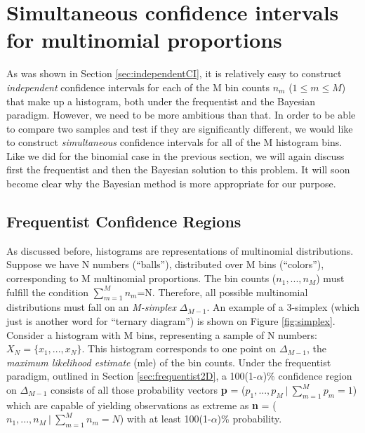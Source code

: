 \documentclass{article}
\begin{document}
\section{Simultaneous confidence intervals for multinomial proportions}
\label{sec:simultaneousCI}

As was shown in Section \ref{sec:independentCI}, it is relatively easy
to construct {\it independent} confidence  intervals for each of the M
bin counts  $n_m$ ($1 \leq m \leq M$) that make up  a histogram, both
under the frequentist  and the Bayesian paradigm. However,  we need to
be  more ambitious  than that.   In order  to be  able to  compare two
samples and test if they are significantly different, we would like to
construct  {\it simultaneous} confidence  intervals for  all of  the M
histogram  bins. Like we  did for  the binomial  case in  the previous
section,  we will  again discuss  first the  frequentist and  then the
Bayesian solution to  this problem. It will soon  become clear why the
Bayesian method is more appropriate for our purpose.

\subsection{Frequentist Confidence Regions} \label{sec:frequentist3D}

As  discussed before,  histograms are  representations  of multinomial
distributions.   Suppose we  have N  numbers  (``balls''), distributed
over M bins (``colors''),  corresponding to M multinomial proportions.
The   bin   counts   ($n_1,...,n_M$)   must  fulfill   the   condition
$\sum_{m=1}^{M}n_m$=N.     Therefore,    all   possible    multinomial
distributions  must fall  on  an {\it  M-simplex} $\Delta_{M-1}$.   An
example  of a  3-simplex (which  just  is another  word for  ``ternary
diagram'') is shown on Figure \ref{fig:simplex}.  Consider a histogram
with    M    bins,   representing    a    sample    of   N    numbers:
$X_N=\{x_1,...,x_N\}$.   This histogram  corresponds to  one  point on
$\Delta_{M-1}$, the {\it maximum likelihood estimate} (mle) of the bin
counts.    Under  the  frequentist   paradigm,  outlined   in  Section
\ref{sec:frequentist2D},  a  100(1-$\alpha$)\%  confidence  region  on
$\Delta_{M-1}$  consists of all  those probability  vectors {\bf  p} =
($p_1,...,  p_M~|~\sum_{m=1}^M p_m=1$) which  are capable  of yielding
observations  as   extreme  as   {\bf  n}  =   ($n_1,  ...,   n_M  ~|~
\sum_{m=1}^Mn_m = N$) with at least 100(1-$\alpha$)\% probability.\\
\end{document}
